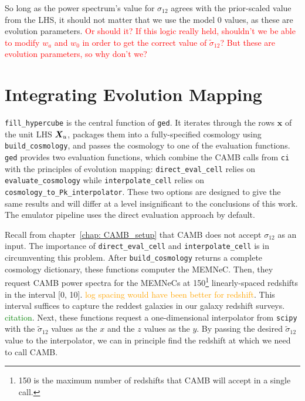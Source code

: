 So long as the power spectrum's value for $\sigma_{12}$ agrees with the
prior-scaled value from the LHS, it should not matter that 
we use the model 0 values, as these are evolution parameters.
\textcolor{red}{Or should it? If this logic really held, shouldn't we be able 
to modify $w_a$ and $w_0$ in order to get the correct value of
$\tilde{\sigma}_{12}$? But these are evolution parameters, so why don't we?}

\section{Integrating Evolution Mapping}
\label{sec: generate_emu_data}



\verb|fill_hypercube| is the central function of \texttt{ged}. It iterates 
through the rows $\bm{x}$ of the unit LHS
$\bm{X}_u$, packages them into a fully-specified cosmology using
\verb|build_cosmology|, and passes the cosmology to one of the 
evaluation functions. \texttt{ged} provides two evaluation functions, which 
combine the CAMB calls from \texttt{ci} with the
principles of evolution mapping: \verb|direct_eval_cell| relies on
\verb|evaluate_cosmology| while \verb|interpolate_cell| relies on
\verb|cosmology_to_Pk_interpolator|. These two options are designed to give
the same results and will differ at a level insignificant to the conclusions
of this work. The emulator pipeline uses the direct evaluation approach by
default.


Recall from chapter~\ref{chap: CAMB_setup} that CAMB does not accept
$\sigma_{12}$ as an input. The importance of \verb|direct_eval_cell| and 
\verb|interpolate_cell| is in circumventing this problem.
After \verb|build_cosmology| returns a complete cosmology dictionary, these
functions computer the MEMNeC. Then, they request CAMB power spectra for the
MEMNeCs at 150\footnote{150 is the maximum number of redshifts that CAMB will
accept in a single call.} linearly-spaced redshifts in the
interval [0, 10]. \textcolor{orange}{log spacing would have been better for
redshift}. This interval suffices to capture the reddest galaxies
in our galaxy redshift surveys. \textcolor{green}{citation}. Next, these
functions request a one-dimensional interpolator from \texttt{scipy} with
the $\tilde{\sigma}_{12}$ values as the $x$ and the $z$ values as the $y$.
By passing the desired $\tilde{\sigma}_{12}$ value to the interpolator, we
can in principle find the redshift at which we need to call CAMB.

